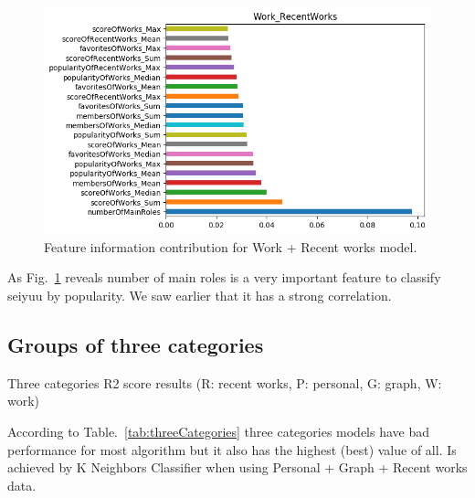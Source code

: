 \begin{figure}[!hbt]
	\centering
	\includegraphics[width=\columnwidth]{graphics/Work_RecentWorks_DTC_featureImportances.png}
	\caption{Feature information contribution for Work + Recent works model.}
	\label{fig:DTC_WR}
\end{figure}

As Fig.~\ref{fig:DTC_WR} reveals number of main roles is a very important feature to classify seiyuu by popularity. We saw earlier that it has a strong correlation.

\FloatBarrier
\subsection{Groups of three categories}
\begin{table}[!hbt]
	\begin{center}
	\caption{Three categories R2 score results (R: recent works, P: personal, G: graph, W: work)}
	\label{tab:threeCategories}
	
	\end{center}
\end{table}

According to Table.~\ref{tab:threeCategories} three categories models have bad performance for most algorithm but it also has the highest (best) value of all. Is achieved by K Neighbors Classifier when using Personal + Graph + Recent works data.

